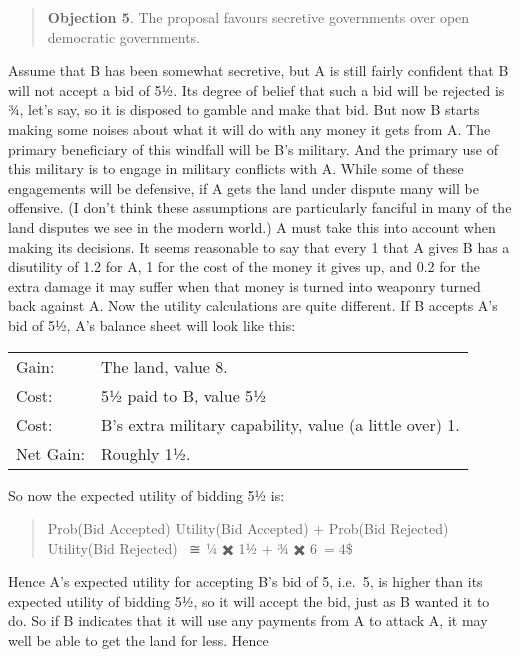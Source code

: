 \documentclass[
  10pt,
  letterpaper,
  DIV=11,
  numbers=noendperiod,
  twoside]{scrartcl}
\begin{document}
\begin{quote}
\textbf{Objection 5}. The proposal favours secretive governments over
open democratic governments.
\end{quote}

Assume that B has been somewhat secretive, but A is still fairly
confident that B will not accept a bid of 5½. Its degree of belief that
such a bid will be rejected is ¾, let's say, so it is disposed to gamble
and make that bid. But now B starts making some noises about what it
will do with any money it gets from A. The primary beneficiary of this
windfall will be B's military. And the primary use of this military is
to engage in military conflicts with A. While some of these engagements
will be defensive, if A gets the land under dispute many will be
offensive. (I don't think these assumptions are particularly fanciful in
many of the land disputes we see in the modern world.) A must take this
into account when making its decisions. It seems reasonable to say that
every 1 that A gives B has a disutility of 1.2 for A, 1 for the cost of
the money it gives up, and 0.2 for the extra damage it may suffer when
that money is turned into weaponry turned back against A. Now the
utility calculations are quite different. If B accepts A's bid of 5½,
A's balance sheet will look like this:

\begin{longtable}[]{@{}ll@{}}
\toprule\noalign{}
\endhead
\bottomrule\noalign{}
\endlastfoot
Gain: & The land, value 8. \\
Cost: & 5½ paid to B, value 5½ \\
Cost: & B's extra military capability, value (a little over) 1. \\
Net Gain: & Roughly 1½. \\
\end{longtable}

So now the expected utility of bidding 5½ is:

\begin{quote}
Prob(Bid Accepted) Utility(Bid Accepted) + Prob(Bid Rejected)
Utility(Bid Rejected)~ ≅ ¼ ✖️ 1½ + ¾ ✖️ 6\(\ 
= 4\)\$
\end{quote}

Hence A's expected utility for accepting B's bid of 5, i.e.~5, is higher
than its expected utility of bidding 5½, so it will accept the bid, just
as B wanted it to do. So if B indicates that it will use any payments
from A to attack A, it may well be able to get the land for less. Hence
\end{document}
